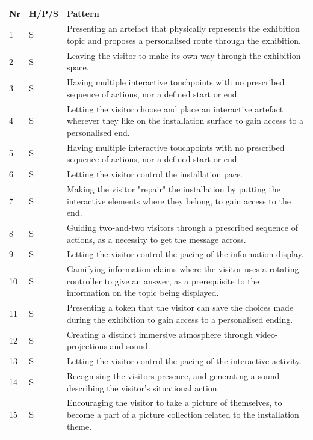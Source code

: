 \begin{table}[H]
\centering
\begin{tabular}{| p{0.75cm} | p{1cm} | p{11cm}| }
\hline
\textbf{Nr} & \textbf{H/P/S} & \textbf{Pattern} \\
\hline
1 & S & Presenting an artefact that physically represents the exhibition topic and proposes a personalised route through the exhibition. \\
\hline
2 & S & Leaving the visitor to make its own way through the exhibition space. \\
\hline
3 & S & Having multiple interactive touchpoints with no prescribed sequence of actions, nor a defined start or end. \\
\hline
4 & S & Letting the visitor choose and place an interactive artefact wherever they like on the installation surface to gain access to a personalised end. \\
\hline
5 & S & Having multiple interactive touchpoints with no prescribed sequence of actions, nor a defined start or end. \\
\hline
6 &S &  Letting the visitor control the installation pace. \\
\hline
7 & S & Making the visitor "repair" the installation by putting the interactive elements where they belong, to gain access to the end. \\
\hline
8 &S &  Guiding two-and-two visitors through a prescribed sequence of actions, as a necessity to get the message across.  \\
\hline
9 &S &  Letting the visitor control the pacing of the information display. \\
\hline
10 & S & Gamifying information-claims where the visitor uses a rotating controller to give an answer, as a prerequisite to the information on the topic being displayed. \\
\hline
11 & S & Presenting a token that the visitor can save the choices made during the exhibition to gain access to a personalised ending. \\
\hline
12 & S & Creating a distinct immersive atmosphere through video-projections and sound. \\
\hline
13 & S & Letting the visitor control the pacing of the interactive activity. \\
\hline
14 & S & Recognising the visitors presence, and generating a sound describing the visitor's situational action. \\
\hline
15 & S &  Encouraging the visitor to take a picture of themselves, to become a part of a picture collection related to the installation theme.  \\

\end{tabular}
\end{table}
